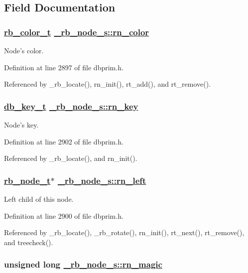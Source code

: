 \subsection{Field Documentation}
\hypertarget{struct__rb__node__s_o1}{
\subsubsection[rn\_\-color]{\setlength{\rightskip}{0pt plus 5cm}\hyperlink{group__dbprim__rbtree_ga4}{rb\_\-color\_\-t} \hyperlink{struct__rb__node__s_o1}{\_\-rb\_\-node\_\-s::rn\_\-color}}}
\label{struct__rb__node__s_o1}


Node's color. 

Definition at line 2897 of file dbprim.h.

Referenced by \_\-rb\_\-locate(), rn\_\-init(), rt\_\-add(), and rt\_\-remove().\hypertarget{struct__rb__node__s_o6}{
\subsubsection[rn\_\-key]{\setlength{\rightskip}{0pt plus 5cm}\hyperlink{struct__db__key__s}{db\_\-key\_\-t} \hyperlink{struct__rb__node__s_o6}{\_\-rb\_\-node\_\-s::rn\_\-key}}}
\label{struct__rb__node__s_o6}


Node's key. 

Definition at line 2902 of file dbprim.h.

Referenced by \_\-rb\_\-locate(), and rn\_\-init().\hypertarget{struct__rb__node__s_o4}{
\subsubsection[rn\_\-left]{\setlength{\rightskip}{0pt plus 5cm}\hyperlink{struct__rb__node__s}{rb\_\-node\_\-t}$\ast$ \hyperlink{struct__rb__node__s_o4}{\_\-rb\_\-node\_\-s::rn\_\-left}}}
\label{struct__rb__node__s_o4}


Left child of this node. 

Definition at line 2900 of file dbprim.h.

Referenced by \_\-rb\_\-locate(), \_\-rb\_\-rotate(), rn\_\-init(), rt\_\-next(), rt\_\-remove(), and treecheck().\hypertarget{struct__rb__node__s_o0}{
\subsubsection[rn\_\-magic]{\setlength{\rightskip}{0pt plus 5cm}unsigned long \hyperlink{struct__rb__node__s_o0}{\_\-rb\_\-node\_\-s::rn\_\-magic}}}
\label{struct__rb__node__s_o0}


